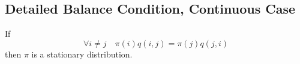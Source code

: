     \subsection{Detailed Balance Condition, Continuous Case}
        \begin{theorem}\label{thm:DetailedBalanceConditionOfCTMarkovChain}
            If
            \[ \forall i \neq j \quad \pi(i)q(i,j) = \pi(j)q(j,i) \]
            then $\pi$ is a stationary distribution.
        \end{theorem}
